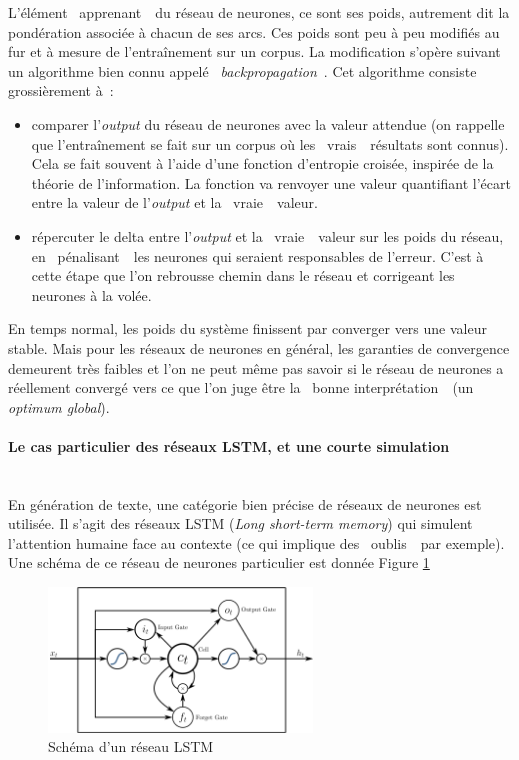 \documentclass{article}
\newcommand{\subsubsubsection}[1]{\paragraph{#1}\mbox{}\\}
\begin{document}
					L'élément \guillemotleft~apprenant~\guillemotright~du réseau de neurones, ce sont ses poids, autrement dit la pondération associée à chacun de ses arcs. Ces poids sont peu à peu modifiés au fur et à mesure de l'entraînement sur un corpus. La modification s'opère suivant un algorithme bien connu appelé \guillemotleft~\textit{backpropagation}~\guillemotright. Cet algorithme consiste grossièrement à~:
					\vspace{2mm}
					\begin{itemize}
						\item comparer l'\textit{output} du réseau de neurones avec la valeur attendue (on rappelle que l'entraînement se fait sur un corpus où les \guillemotleft~vrais~\guillemotright~résultats sont connus). Cela se fait souvent à  l'aide d'une fonction d'entropie croisée, inspirée de la théorie de l'information. La fonction va renvoyer une valeur quantifiant l'écart entre la valeur de l'\textit{output} et la \guillemotleft~vraie~\guillemotright~valeur.
						\item répercuter le delta entre l'\textit{output} et la \guillemotleft~vraie~\guillemotright~valeur sur les poids du réseau, en \guillemotleft~pénalisant~\guillemotright~les neurones qui seraient responsables de l'erreur. C'est à cette étape que l'on rebrousse chemin dans le réseau et corrigeant les neurones à la volée.
					\end{itemize}
					\vspace{2mm}
					En temps normal, les poids du système finissent par converger vers une valeur stable. Mais pour les réseaux de neurones en général, les garanties de convergence demeurent très faibles et l'on ne peut même pas savoir si le réseau de neurones a réellement convergé vers ce que l'on juge être la \guillemotleft~bonne interprétation~\guillemotright~(un \textit{optimum global}).
				\subsubsubsection{Le cas particulier des réseaux LSTM, et une courte simulation}\label{lstm_hugo}
					En génération de texte, une catégorie bien précise de réseaux de neurones est utilisée. Il s'agit des réseaux LSTM (\textit{Long short-term memory}) qui simulent l'attention humaine face au contexte (ce qui implique des \guillemotleft~oublis~\guillemotright~par exemple). Une schéma de ce réseau de neurones particulier est donnée Figure \ref{fig:lstm}
					\begin{figure}[H]
						\centering
						\includegraphics[width=7cm]{lstm.png}
						\caption{Schéma d'un réseau LSTM}
						\label{fig:lstm}
					\end{figure}
\end{document}
